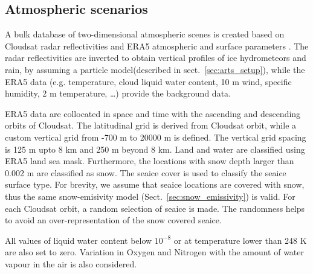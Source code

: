 \documentclass[amt, manuscript]{copernicus}
\begin{document}



\subsection{Atmospheric scenarios}
\label{sec:atm_scenes}

A bulk database of two-dimensional atmospheric scenes is created based on Cloudsat radar reflectivities \citep{marchand:hydro:08} and ERA5 atmospheric and surface parameters \citep{era5:18}. The radar reflectivities are inverted to obtain vertical profiles of ice hydrometeors and rain, by assuming a particle model(described in sect.~\ref{sec:arts_setup}), while the ERA5 data (e.g. temperature, cloud liquid water content, 10\,\,m wind, specific humidity, 2\,\,m temperature, \dots) provide the background data.

ERA5 data are collocated in space and time with the ascending and descending orbits of Cloudsat. The latitudinal grid is derived from Cloudsat orbit, while a custom vertical grid from -700\,\,m to 20000\,\,m is defined. The vertical grid spacing is 125\,\,m upto 8\,\,km and 250\,\,m beyond 8\,\,km. Land and water are classified using ERA5 land sea mask. Furthermore, the locations with snow depth larger than 0.002\,\,m are classified as snow. The seaice cover is used to classify the seaice surface type. For brevity, we assume that seaice locations are covered with snow, thus the same snow-emisivity model (Sect.~\ref{sec:snow_emissivity}) is valid. For each Cloudsat orbit, a random selection of seaice is made. The randomness helps to avoid an over-representation of the snow covered seaice. 

All values of liquid water content below $10^{-8}$ or at temperature lower than 248\,\,K are also set to zero. Variation in Oxygen and Nitrogen with the amount of water vapour in the air is also considered.  
\end{document}
